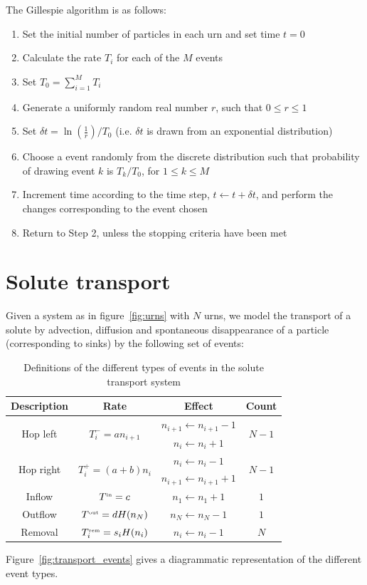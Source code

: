 \documentclass[a4paper,11pt]{article}
\numberwithin{equation}{section}
\newcommand{\Sst}[1]{^\text{\tiny #1}}
\begin{document}
The Gillespie algorithm is as follows:
\begin{enumerate}
    \item Set the initial number of particles in each urn and set time \(t=0\)
    \item Calculate the rate \(T_i\) for each of the \(M\) events
    \item Set \(T_0 = \sum_{i=1}^M T_i\)
    \item Generate a uniformly random real number \(r\), such that \(0 \le r \le 1\)
    \item Set \(\delta t = \ln\left(\frac{1}{r}\right)/T_0\) (i.e. \(\delta t\)
        is drawn from an exponential distribution)
    \item Choose a event randomly from the discrete distribution such that
        probability of drawing event \(k\) is \(T_k/T_0\), for \(1 \le k \le
        M\)
    \item Increment time according to the time step, \(t \leftarrow t + \delta
        t\), and perform the changes corresponding to the event chosen
    \item Return to Step 2, unless the stopping criteria have been met
\end{enumerate}

\section{Solute transport}
Given a system as in figure~\ref{fig:urns} with \(N\) urns, we model the
transport of a solute by advection, diffusion and spontaneous disappearance of a
particle (corresponding to sinks) by the following set of events:

\begin{table}[ht!]
    \centering
    \begin{tabular}{ c | c | c | c }
        Description & Rate & Effect & Count \\ \hline\hline
        \multirow{2}{*}{Hop left} & \multirow{2}{*}{\(T^-_i = a n_{i+1}\)} &
        \(n_{i+1} \leftarrow n_{i+1} - 1\) & \multirow{2}{*}{\(N-1\)} \\
        & & \(n_i \leftarrow n_i + 1\) \\ \hline
        \multirow{2}{*}{Hop right} & \multirow{2}{*}{\(T^+_i = (a+b) n_i\)} &
        \(n_i \leftarrow n_i - 1\) & \multirow{2}{*}{\(N-1\)} \\
        & & \(n_{i+1} \leftarrow n_{i+1} + 1\) \\ \hline
        Inflow & \(T\Sst{in} = c\) & \(n_1 \leftarrow n_1 + 1\) & \(1\) \\ \hline
        Outflow & \(T\Sst{out} = d H(n_N)\) & \(n_N \leftarrow n_N - 1\) & \(1\) \\ \hline
        Removal & \(T\Sst{rem}_i = s_i H(n_i)\) & \(n_i \leftarrow n_i - 1\) & \(N\) \\
    \end{tabular}
    \caption{\label{tab:transport_events}Definitions of the different types of
events in the solute transport system}
\end{table}
Figure~\ref{fig:transport_events} gives a diagrammatic representation of the
different event types.
\end{document}
